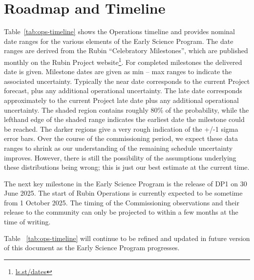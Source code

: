 \section{Roadmap and Timeline} \label{sec:timeline}

Table~\ref{tab:ops-timeline} shows the Operations timeline and provides nominal date ranges for the various elements of the Early Science Program.
The date ranges are derived from the Rubin ``Celebratory Milestones'', which are  published monthly on the Rubin Project website\footnote{\url{ls.st/dates}}.
For completed milestones the delivered date is given.
Milestone dates are given as min -- max ranges to indicate the associated uncertainty.
Typically the near date corresponds to the current Project forecast, plus any additional operational uncertainty.
The late date corresponds approximately to the current Project late date plus any additional operational uncertainty.
The shaded region contains roughly 80\% of the probability, while the lefthand edge of the shaded range indicates the earliest date the milestone could be reached.
The darker regions give a very rough indication of the +/-1 sigma error bars.
Over the course of the commissioning period, we expect these data ranges to shrink as our understanding of the remaining schedule uncertainty improves.
However, there is still the possibility of the assumptions underlying these distributions being wrong; this is just our best estimate at the current time.



The next key milestone in the Early Science Program is the release of DP1 on  30 June 2025.
The  start of Rubin Operations is currently expected to be sometime from 1 October 2025.
The timing of the Commissioning observations and their release to the community can only be projected to within a few months at the time of writing.

Table ~\ref{tab:ops-timeline} will continue to be refined and updated in future version of this document as the Early Science Program progresses.
